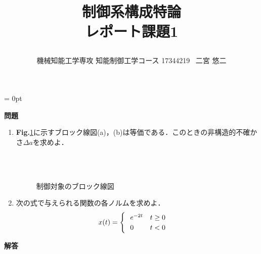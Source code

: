 \documentclass[a4paper,11pt]{jarticle}
\title{\vspace{-20truemm}
{\normalsize \rightline{平成29年\ 7月\ 21日}}
{\large 制御系構成特論\\}
レポート課題1\\
\date{}
\vspace{-2truemm}}
\author{機械知能工学専攻 知能制御工学コース \hspace{3mm} 17344219 \ 二宮 悠二}
\begin{document}
\parindent = 0pt %
\titlepage
\maketitle
{\Large{\bf 問題}}
\begin{enumerate}
 \item {\bf Fig.}{\ref{blocks}}に示すブロック線図(a)，(b)は等価である．このときの非構造的不確かさ$ \Delta a $を求めよ．
  \begin{figure}[H]
   \centering
  \\
   \vspace{0.5cm}
  \\
   \caption{制御対象のブロック線図}
   \label{blocks}
  \end{figure}
 \item 次の式で与えられる関数の各ノルムを求めよ．\\
  \begin{equation}
   x(t) = \begin{cases} \nonumber
		 \begin{array}[t]{lc}
		  e^{-2t} & t \geq 0 \\
		  0       & t < 0 \\
		 \end{array}
		\end{cases}
  \end{equation}
\end{enumerate}
{\Large{\bf 解答}}
\end{document}
